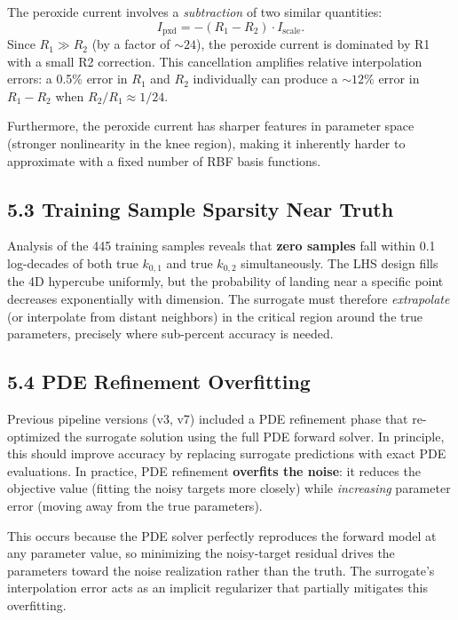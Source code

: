 \documentclass[11pt]{article}
\begin{document}
The peroxide current involves a \emph{subtraction} of two similar quantities:
\begin{equation}
  I_{\text{pxd}} = -(R_1 - R_2) \cdot I_{\text{scale}}.
\end{equation}
Since $R_1 \gg R_2$ (by a factor of ${\sim}24$), the peroxide current is
dominated by R1 with a small R2 correction.  This cancellation amplifies
relative interpolation errors: a 0.5\% error in $R_1$ and $R_2$ individually
can produce a ${\sim}12\%$ error in $R_1 - R_2$ when $R_2/R_1 \approx 1/24$.

Furthermore, the peroxide current has sharper features in parameter space
(stronger nonlinearity in the knee region), making it inherently harder to
approximate with a fixed number of RBF basis functions.

\subsection*{5.3 Training Sample Sparsity Near Truth}

Analysis of the 445 training samples reveals that \textbf{zero samples} fall
within 0.1 log-decades of both true $k_{0,1}$ and true $k_{0,2}$
simultaneously.  The LHS design fills the 4D hypercube uniformly, but the
probability of landing near a specific point decreases exponentially with
dimension.  The surrogate must therefore \emph{extrapolate} (or interpolate
from distant neighbors) in the critical region around the true parameters,
precisely where sub-percent accuracy is needed.

\subsection*{5.4 PDE Refinement Overfitting}

Previous pipeline versions (v3, v7) included a PDE refinement phase that
re-optimized the surrogate solution using the full PDE forward solver.  In
principle, this should improve accuracy by replacing surrogate predictions
with exact PDE evaluations.  In practice, PDE refinement \textbf{overfits
the noise}: it reduces the objective value (fitting the noisy targets more
closely) while \emph{increasing} parameter error (moving away from the true
parameters).

This occurs because the PDE solver perfectly reproduces the forward model
at any parameter value, so minimizing the noisy-target residual drives the
parameters toward the noise realization rather than the truth.  The surrogate's
interpolation error acts as an implicit regularizer that partially mitigates
this overfitting.
\end{document}
